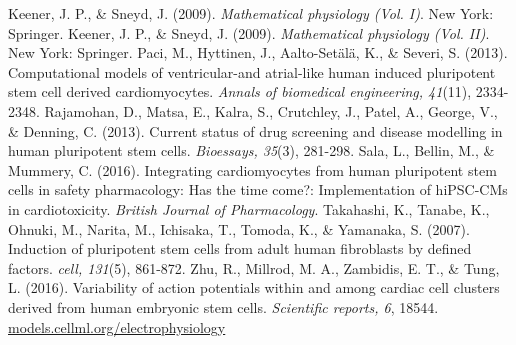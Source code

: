 \documentclass[12pt,a4paper]{article}
\begin{document}
\begin{thebibliography}{99}
 Keener, J. P., \& Sneyd, J. (2009). \textit{Mathematical physiology (Vol. I)}. New York: Springer.
 Keener, J. P., \& Sneyd, J. (2009). \textit{Mathematical physiology (Vol. II)}. New York: Springer.
 Paci, M., Hyttinen, J., Aalto-Set\"al\"a, K., \& Severi, S. (2013). Computational models of ventricular-and atrial-like human induced pluripotent stem cell derived cardiomyocytes. \textit{Annals of biomedical engineering, 41}(11), 2334-2348.
 Rajamohan, D., Matsa, E., Kalra, S., Crutchley, J., Patel, A., George, V., \& Denning, C. (2013). Current status of drug screening and disease modelling in human pluripotent stem cells. \textit{Bioessays, 35}(3), 281-298.
 Sala, L., Bellin, M., \& Mummery, C. (2016). Integrating cardiomyocytes from human pluripotent stem cells in safety pharmacology: Has the time come?: Implementation of hiPSC-CMs in cardiotoxicity. \textit{British Journal of Pharmacology}.
 Takahashi, K., Tanabe, K., Ohnuki, M., Narita, M., Ichisaka, T., Tomoda, K., \& Yamanaka, S. (2007). Induction of pluripotent stem cells from adult human fibroblasts by defined factors. \textit{cell, 131}(5), 861-872.
 Zhu, R., Millrod, M. A., Zambidis, E. T., \& Tung, L. (2016). Variability of action potentials within and among cardiac cell clusters derived from human embryonic stem cells. \textit{Scientific reports, 6}, 18544.
 \url{models.cellml.org/electrophysiology}
\end{thebibliography}
\end{document}
